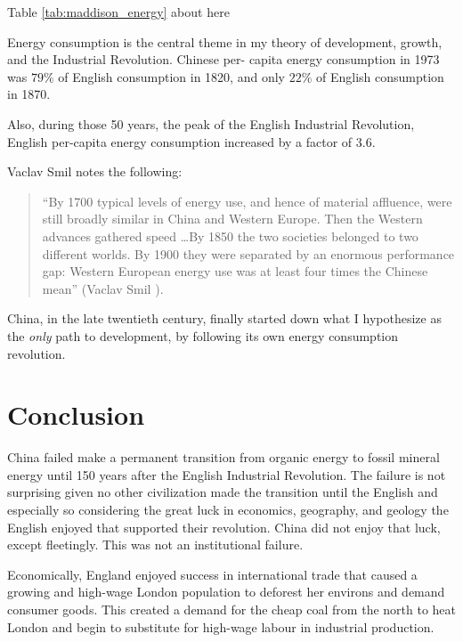 \documentclass[12pt]{article}
\numberwithin{equation}{section}
\begin{document}
\begin{center}
Table \ref{tab:maddison_energy} about here
\end{center}	

	
	Energy consumption is the central theme in my theory of development, growth, and the Industrial Revolution. Chinese per- capita energy consumption in 1973 was $79\%$ of English consumption in 1820, and only $22\%$ of English consumption in 1870.
	
	Also, during those 50 years, the peak of the English Industrial Revolution, English per-capita energy consumption increased by a factor of 3.6. 
	
	Vaclav Smil notes the following:
	
	\begin{quotation}
	``By 1700 typical levels of energy use, and hence of material affluence, were still broadly similar in China and Western Europe. Then the Western advances gathered speed \ldots By 1850 the two societies belonged to two different worlds. By 1900 they were separated by an enormous performance gap: Western European energy use was at least four times the Chinese mean'' (Vaclav Smil \citeyear[p.~234]{smil_energy_1994}).
	\end{quotation} 
	
	China, in the late twentieth century, finally started down what I hypothesize as the \textit{only} path to development, by following its own energy consumption revolution.
	
	\section*{Conclusion}

	China failed make a permanent transition from organic energy to fossil mineral energy until 150 years after the English Industrial Revolution. The failure is not surprising given no other civilization made the transition until the English and especially so considering the great luck in economics, geography, and geology the English enjoyed that supported their revolution. China did not enjoy that luck, except fleetingly. This was not an institutional failure.
	
	Economically, England enjoyed success in international trade that caused a growing and high-wage London population to deforest her environs and demand consumer goods. This created a demand for the cheap coal from the north to heat London and begin to substitute for high-wage labour in industrial production.
	
\end{document}
